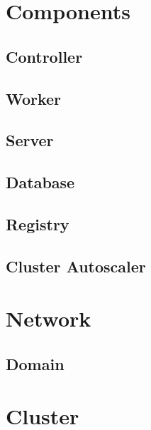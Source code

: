 \section{Components}
\label{sec:architecture_components}

\subsection{Controller}
\label{subsec:architecture_components_controller}

\subsection{Worker}
\label{subsec:architecture_components_worker}

\subsection{Server}
\label{subsec:architecture_components_server}

\subsection{Database}
\label{subsec:architecture_components_database}

\subsection{Registry}
\label{subsec:architecture_components_registry}

\subsection{Cluster Autoscaler}
\label{subsec:architecture_components_cluster_autoscaler}

\section{Network}
\label{sec:architecture_network}

\subsection{Domain}
\label{subsec:architecture_network_domain}

\section{Cluster}
\label{sec:architecture_cluster}

